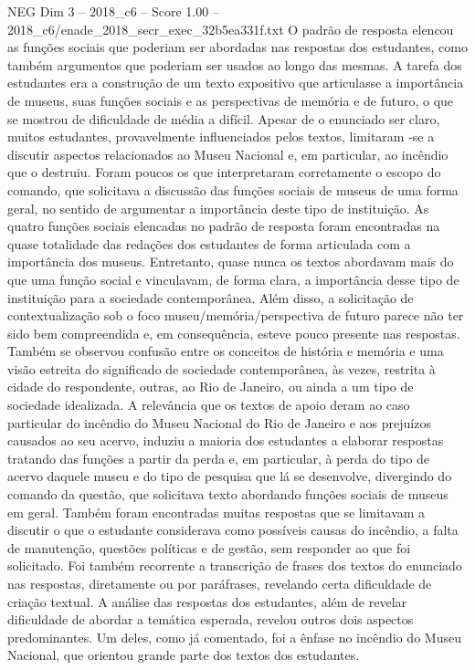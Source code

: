 \begin{textsample}{NEG Dim 3 – 2018\_c6 – Score 1.00 – 2018\_c6/enade\_2018\_secr\_exec\_32b5ea331f.txt}
O padrão de resposta elencou as funções sociais que poderiam ser abordadas nas respostas dos estudantes, como também argumentos que poderiam ser usados ao longo das mesmas.
A tarefa dos estudantes era a construção de um texto expositivo que articulasse a importância de museus, suas funções sociais e as perspectivas de memória e de futuro, o que se mostrou de dificuldade de média a difícil.
Apesar de o enunciado ser claro, muitos estudantes, provavelmente influenciados pelos textos, limitaram -se a discutir aspectos relacionados ao Museu Nacional e, em particular, ao incêndio que o destruiu.
Foram poucos os que interpretaram corretamente o escopo do comando, que solicitava a discussão das funções sociais de museus de uma forma geral, no sentido de argumentar a importância deste tipo de instituição.
As quatro funções sociais elencadas no padrão de resposta foram encontradas na quase totalidade das redações dos estudantes de forma articulada com a importância dos museus.
Entretanto, quase nunca os textos abordavam mais do que uma função social e vinculavam, de forma clara, a importância desse tipo de instituição para a sociedade contemporânea.
Além disso, a solicitação de contextualização sob o foco museu/memória/perspectiva de futuro parece não ter sido bem compreendida e, em consequência, esteve pouco presente nas respostas.
Também se observou confusão entre os conceitos de história e memória e uma visão estreita do significado de sociedade contemporânea, às vezes, restrita à cidade do respondente, outras, ao Rio de Janeiro, ou ainda a um tipo de sociedade idealizada.
A relevância que os textos de apoio deram ao caso particular do incêndio do Museu Nacional do Rio de Janeiro e aos prejuízos causados ao seu acervo, induziu a maioria dos estudantes a elaborar respostas tratando das funções a partir da perda e, em particular, à perda do tipo de acervo daquele museu e do tipo de pesquisa que lá se desenvolve, divergindo do comando da questão, que solicitava texto abordando funções sociais de museus em geral.
Também foram encontradas muitas respostas que se limitavam a discutir o que o estudante considerava como possíveis causas do incêndio, a falta de manutenção, questões políticas e de gestão, sem responder ao que foi solicitado.
Foi também recorrente a transcrição de frases dos textos do enunciado nas respostas, diretamente ou por paráfrases, revelando certa dificuldade de criação textual.
A análise das respostas dos estudantes, além de revelar dificuldade de abordar a temática esperada, revelou outros dois aspectos predominantes.
Um deles, como já comentado, foi a ênfase no incêndio do Museu Nacional, que orientou grande parte dos textos dos estudantes.

\end{textsample}
